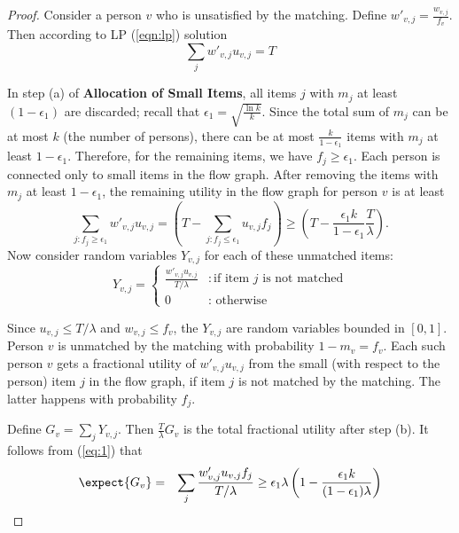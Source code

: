 \begin{proof}
Consider a person $v$ who is unsatisfied by the matching. Define $w'_{v,j}=\frac{w_{v,j}}{f_{v}}$. Then according to LP (\ref{eqn:lp}) solution
\begin{equation}
\sum_{j}w'_{v,j} u_{v,j} =T
\end{equation}


In step (a) of {\bf Allocation of Small Items}, all items $j$ with $m_{j}$
 at least $(1-\epsilon_1)$ are discarded; recall that $\epsilon_1=\sqrt{\frac{\ln{k}}{k}}$. Since the total sum of $m_j$ can be at most $k$ (the number of persons), there can be at most $\frac{k}{1-\epsilon_1}$ items with $m_j$ at least $1-\epsilon_1$. Therefore, for the remaining items, we have $f_j \geq \epsilon_1$. Each person is connected only to small items in the flow graph. After removing the items with $m_j$ at least $1-\epsilon_1$, the remaining utility in the flow graph for person $v$ is  at least
 \begin{equation}
 \label{eq:1}
 \sum_{j: f_j \geq \epsilon_1}w'_{v,j} u_{v,j} =
 \left(T-\sum_{j: f_{j}\leq \epsilon_1} u_{v,j} f_{j}\right)\geq \left( T-\frac{\epsilon_1 k}{1-\epsilon_1}\frac{T}{\lambda}\right).
\end{equation}
 Now consider random variables $Y_{v,j}$ for each of these unmatched items:
\begin{equation}
\label{eqn:def}
Y_{v,j} = \begin{cases}  \frac{w'_{v,j} u_{v,j}}{T/\lambda} &: \text{if item $j$ is not matched} \\
0 &: \text{ otherwise} \end{cases}
\end{equation}

Since $u_{v,j} \leq T/\lambda$ and $w_{v,j} \leq f_{v}$, the
$Y_{v,j}$ are random variables bounded in $[0,1]$. Person $v$ is unmatched by the matching
with probability $1-m_v=f_v$. Each such person $v$  gets
a fractional utility of $w'_{v,j} u_{v,j}$ from the small (with respect to the person) item $j$ in the flow graph, if item $j$ is
not matched by the matching. The latter happens with probability $f_{j}$.

Define $G_{v}=\sum_{j}Y_{v,j}$. Then $\frac{T}{\lambda} G_v$ is the total fractional utility after step (b). It
follows from (\ref{eq:1}) that
\begin{eqnarray*}
\expect{G_{v}}&=&\sum_{j}\frac{w'_{v,j}u_{v,j}f_j}{T/\lambda}\geq \epsilon_1 \lambda \left(1-\frac{\epsilon_1 k}{(1-\epsilon_1)\lambda}\right)
\end{eqnarray*}


\end{proof}
